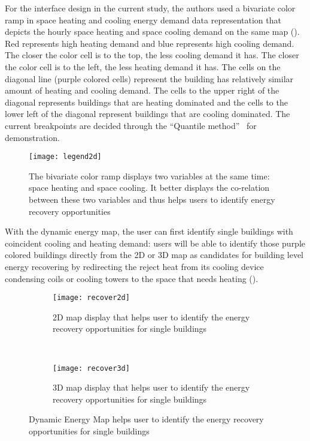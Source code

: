 For the interface design in the current study, the authors used a
bivariate color ramp in space heating and cooling energy demand data
representation that depicts the hourly space heating and space cooling
demand on the same map (). Red represents high
heating demand and blue represents high cooling demand. The closer the
color cell is to the top, the less cooling demand it has. The closer
the color cell is to the left, the less heating demand it has. The
cells on the diagonal line (purple colored cells) represent the
building has relatively similar amount of heating and cooling
demand. The cells to the upper right of the diagonal represents
buildings that are heating dominated and the cells to the lower left
of the diagonal represent buildings that are cooling dominated. The
current breakpoints are decided through the ``Quantile
method''~\cite{GIS_Jenks2014} for demonstration.

\begin{figure}[h!]
  \centering
  \texttt{[image: legend2d]}
  \caption[Bi-Variate Color Ramp]{The bivariate color ramp displays
    two variables at the same time: space heating and space
    cooling. It better displays the co-relation between these two
    variables and thus helps users to identify energy recovery
    opportunities}
  \label{fig:legend2d}
\end{figure}

With the dynamic energy map, the user can first identify single
buildings with coincident cooling and heating demand: users will be
able to identify those purple colored buildings directly from the 2D
or 3D map as candidates for building level energy recovering by
redirecting the reject heat from its cooling device condensing coils
or cooling towers to the space that needs heating
().

\begin{figure}[h!]
  \centering
  \begin{subfigure}{0.7\textwidth}
  \centering
  \texttt{[image: recover2d]}
  \caption[Energy Recovery Single Building, 2D]{2D map display that
    helps user to identify the energy recovery opportunities for
    single buildings}
  \label{fig:recover2d}
\end{subfigure}
~
\begin{subfigure}{0.7\textwidth}
  \centering
  \texttt{[image: recover3d]}
  \caption[Energy Recovery Single Building, 3D]{3D map display that
    helps user to identify the energy recovery opportunities for
    single buildings}
  \label{fig:recover3d}
\end{subfigure}
\caption[Single Building Energy Recovery]{Dynamic Energy Map helps
  user to identify the energy recovery opportunities for single
  buildings}
\label{fig:recoverSig}
\end{figure}

